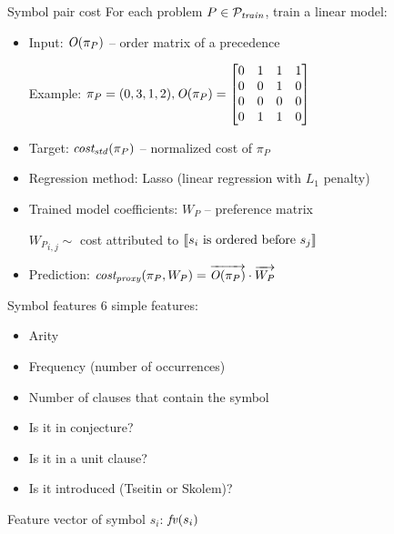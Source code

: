 \documentclass[notes]{beamer}
\begin{document}
\begin{frame}{Symbol pair cost}
For each problem $P \in \mathcal{P}_{\mathit{train}}$, train a linear model:

\begin{itemize}
	\item Input: $\operatorname{\mathit{O}}(\pi_P)$ -- order matrix of a precedence
	
	Example: $\pi_P = (0, 3, 1, 2),
	\operatorname{\mathit{O}}(\pi_P) =
	\begin{bmatrix}
	0 & 1 & 1 & 1 \\
	0 & 0 & 1 & 0 \\
	0 & 0 & 0 & 0 \\
	0 & 1 & 1 & 0
	\end{bmatrix}
	$
	\item Target: $\operatorname{\mathit{cost_{std}}}(\pi_P)$ -- normalized cost of $\pi_P$
	\item Regression method: Lasso (linear regression with $L_1$ penalty)
	\item Trained model coefficients: $W_P$ -- preference matrix
	
	${W_P}_{i,j} \sim$ cost attributed to $\left \llbracket s_i\text{ is ordered before }s_j \right \rrbracket$
	\item Prediction: $\operatorname{\mathit{cost_{proxy}}}(\pi_P, W_P) = \overrightarrow{\operatorname{\mathit{O}}(\pi_P)} \cdot \overrightarrow{W_P}$
\end{itemize}
\end{frame}

\begin{frame}{Symbol features}
6 simple features:
\begin{itemize}
	\item Arity
	\item Frequency (number of occurrences)
	\item Number of clauses that contain the symbol
	\item Is it in conjecture?
	\item Is it in a unit clause?
	\item Is it introduced (Tseitin or Skolem)?
\end{itemize}
Feature vector of symbol $s_i$: $\mathit{fv}(s_i)$
\end{frame}
\end{document}
